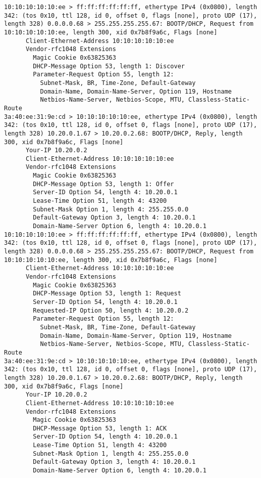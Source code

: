 \documentclass[a4paper,12pt]{article}
\begin{document}
\begin{Verbatim}
10:10:10:10:10:ee > ff:ff:ff:ff:ff:ff, ethertype IPv4 (0x0800), length 342: (tos 0x10, ttl 128, id 0, offset 0, flags [none], proto UDP (17), length 328) 0.0.0.0.68 > 255.255.255.255.67: BOOTP/DHCP, Request from 10:10:10:10:10:ee, length 300, xid 0x7b8f9a6c, Flags [none]
	  Client-Ethernet-Address 10:10:10:10:10:ee
	  Vendor-rfc1048 Extensions
	    Magic Cookie 0x63825363
	    DHCP-Message Option 53, length 1: Discover
	    Parameter-Request Option 55, length 12: 
	      Subnet-Mask, BR, Time-Zone, Default-Gateway
	      Domain-Name, Domain-Name-Server, Option 119, Hostname
	      Netbios-Name-Server, Netbios-Scope, MTU, Classless-Static-Route
3a:40:ee:31:9e:cd > 10:10:10:10:10:ee, ethertype IPv4 (0x0800), length 342: (tos 0x10, ttl 128, id 0, offset 0, flags [none], proto UDP (17), length 328) 10.20.0.1.67 > 10.20.0.2.68: BOOTP/DHCP, Reply, length 300, xid 0x7b8f9a6c, Flags [none]
	  Your-IP 10.20.0.2
	  Client-Ethernet-Address 10:10:10:10:10:ee
	  Vendor-rfc1048 Extensions
	    Magic Cookie 0x63825363
	    DHCP-Message Option 53, length 1: Offer
	    Server-ID Option 54, length 4: 10.20.0.1
	    Lease-Time Option 51, length 4: 43200
	    Subnet-Mask Option 1, length 4: 255.255.0.0
	    Default-Gateway Option 3, length 4: 10.20.0.1
	    Domain-Name-Server Option 6, length 4: 10.20.0.1
10:10:10:10:10:ee > ff:ff:ff:ff:ff:ff, ethertype IPv4 (0x0800), length 342: (tos 0x10, ttl 128, id 0, offset 0, flags [none], proto UDP (17), length 328) 0.0.0.0.68 > 255.255.255.255.67: BOOTP/DHCP, Request from 10:10:10:10:10:ee, length 300, xid 0x7b8f9a6c, Flags [none]
	  Client-Ethernet-Address 10:10:10:10:10:ee
	  Vendor-rfc1048 Extensions
	    Magic Cookie 0x63825363
	    DHCP-Message Option 53, length 1: Request
	    Server-ID Option 54, length 4: 10.20.0.1
	    Requested-IP Option 50, length 4: 10.20.0.2
	    Parameter-Request Option 55, length 12: 
	      Subnet-Mask, BR, Time-Zone, Default-Gateway
	      Domain-Name, Domain-Name-Server, Option 119, Hostname
	      Netbios-Name-Server, Netbios-Scope, MTU, Classless-Static-Route
3a:40:ee:31:9e:cd > 10:10:10:10:10:ee, ethertype IPv4 (0x0800), length 342: (tos 0x10, ttl 128, id 0, offset 0, flags [none], proto UDP (17), length 328) 10.20.0.1.67 > 10.20.0.2.68: BOOTP/DHCP, Reply, length 300, xid 0x7b8f9a6c, Flags [none]
	  Your-IP 10.20.0.2
	  Client-Ethernet-Address 10:10:10:10:10:ee
	  Vendor-rfc1048 Extensions
	    Magic Cookie 0x63825363
	    DHCP-Message Option 53, length 1: ACK
	    Server-ID Option 54, length 4: 10.20.0.1
	    Lease-Time Option 51, length 4: 43200
	    Subnet-Mask Option 1, length 4: 255.255.0.0
	    Default-Gateway Option 3, length 4: 10.20.0.1
	    Domain-Name-Server Option 6, length 4: 10.20.0.1
\end{Verbatim}
\end{document}
